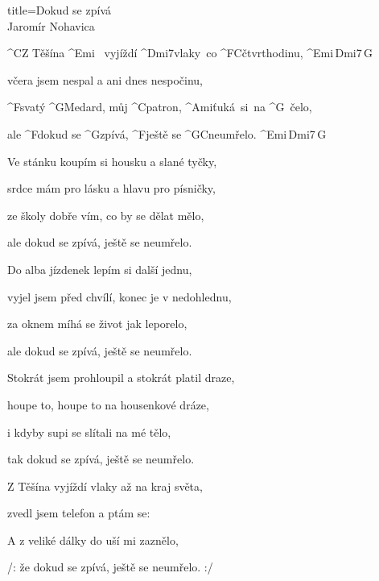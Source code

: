 \begin{song}{title=\predtitle\centering Dokud se zpívá \\\large Jaromír Nohavica  \vspace*{-0.3cm}}  %
\begin{centerjustified}
\nejnejvetsi

\sloka
	^{C}Z Těšína ^{Emi\,\,\,\,\,}vyjíždí ^{Dmi7\z}vlaky~co ^{F{\z}C}čtvrthodinu, ^{Emi\,Dmi7\,G}

	včera jsem nespal a ani dnes nespočinu,

	^{F}svatý ^{G}Medard, můj ^{C}patron, ^{\z Ami\:\:\:}ťuká~si~na ^{\z G \,}čelo,

	ale ^{F}dokud se ^{G}zpívá, ^{F}ještě se ^{G{\z}C}neumřelo. ^{Emi\,Dmi7\,G}

\sloka
	Ve stánku koupím si housku a slané tyčky,

	srdce mám pro lásku a hlavu pro písničky,

	ze školy dobře vím, co by se dělat mělo,

	ale dokud se zpívá, ještě se neumřelo.

\sloka
	Do alba jízdenek lepím si další jednu,

	vyjel jsem před chvílí, konec je v nedohlednu,

	za oknem míhá se život jak leporelo,

	ale dokud se zpívá, ještě se neumřelo.

\sloka
	Stokrát jsem prohloupil a stokrát platil draze,

	houpe to, houpe to na housenkové dráze,

	i kdyby supi se slítali na mé tělo,

	tak dokud se zpívá, ještě se neumřelo.

\sloka
	Z Těšína vyjíždí vlaky až na kraj světa,

	zvedl jsem telefon a ptám se: 

	A z veliké dálky do uší mi zaznělo,

	/: že dokud se zpívá, ještě se neumřelo. :/


\end{centerjustified}

\centering
{}

\setcounter{Slokočet}{0}
\end{song}
